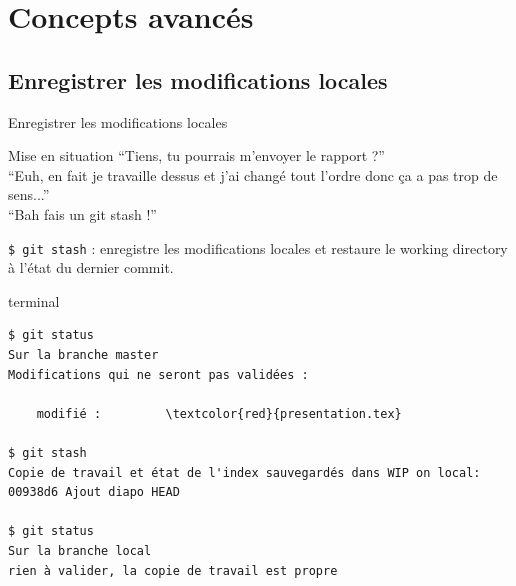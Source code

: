 \documentclass[usepdftitle=false]{beamer}
\begin{document}
\section{Concepts avancés}

\subsection{Enregistrer les modifications locales}

\begin{frame}[fragile]{Enregistrer les modifications locales}
	\begin{block}{Mise en situation}
		\enquote{Tiens, tu pourrais m'envoyer le rapport ?} \\
		\enquote{Euh, en fait je travaille dessus et j'ai changé tout l'ordre donc ça a pas trop de sens...} \\
		\enquote{Bah fais un git stash !}
	\end{block}

	\verb+$ git stash+ : enregistre les modifications locales et restaure le working directory à l'état du dernier commit.

	\begin{beamercolorbox}[rounded=true,shadow=true]{terminal}
	\begin{Verbatim}
$ git status
Sur la branche master 
Modifications qui ne seront pas validées :

	modifié :         \textcolor{red}{presentation.tex}

$ git stash
Copie de travail et état de l'index sauvegardés dans WIP on local: 00938d6 Ajout diapo HEAD

$ git status
Sur la branche local
rien à valider, la copie de travail est propre
\end{Verbatim}
	\end{beamercolorbox}
\end{frame}
\end{document}
